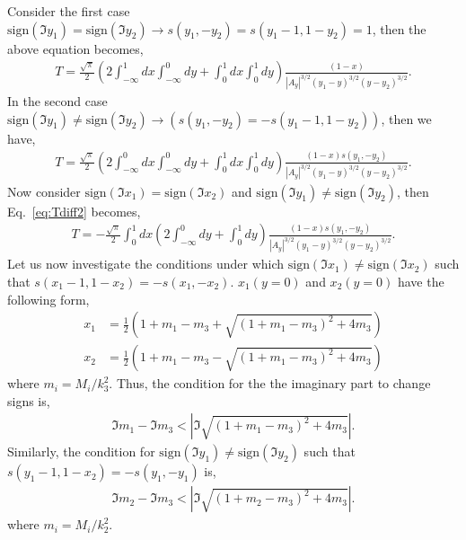 \documentclass[twoside]{article}
\begin{document}
Consider the first case $\textrm{sign}(\Im y_1) = \textrm{sign}(\Im y_2) \rightarrow s(y_1, -y_2) = s(y_1 - 1, 1 - y_2) = 1$, then the above equation becomes,
\begin{align}
  T = \frac{\sqrt{\pi}}{2}\left(2\int^1_{-\infty}dx\int^0_{-\infty}dy + \int^1_0dx\int^1_0dy
  \right)\frac{(1-x)}{|A_y|^{3/2}(y_1 - y)^{3/2}(y - y_2)^{3/2}}.
\end{align}
In the second case $\textrm{sign}(\Im y_1) \neq \textrm{sign}(\Im y_2) \rightarrow (s(y_1, -y_2) = -s(y_1 - 1, 1-y_2))$, then we have,
\begin{align}
  T = \frac{\sqrt{\pi}}{2}\left( 2\int^0_{-\infty}dx\int^0_{-\infty}dy + \int^1_0dx\int^1_0dy
  \right)\frac{(1-x)s(y_1,-y_2)}{|A_y|^{3/2}(y_1-y)^{3/2}(y-y_2)^{3/2}}.
\end{align}
Now consider $\textrm{sign}(\Im x_1) = \textrm{sign}(\Im x_2)$ and $\textrm{sign}(\Im y_1) \neq \textrm{sign}(\Im y_2)$, then
Eq.~\eqref{eq:Tdiff2} becomes,
\begin{align}
  T = -\frac{\sqrt{\pi}}{2}\int^1_0dx\left( 2\int^0_{-\infty}dy + \int^1_0dy
  \right)\frac{(1-x)s(y_1,-y_2)}{|A_y|^{3/2}(y_1-y)^{3/2}(y - y_2)^{3/2}}.
\end{align}
Let us now investigate the conditions under which $\textrm{sign}(\Im x_1) \neq \textrm{sign}(\Im x_2)$ such that $s(x_1 - 1 , 1 - x_2) =
-s(x_1, -x_2)$. $x_1(y = 0)$ and $x_2(y = 0)$ have the following form,
\begin{align}
  x_1 &=  \frac{1}{2}\left( 1 + m_1 - m_3 + \sqrt{(1 + m_1 - m_3)^2 + 4m_3} \right)\\
  x_2 &=  \frac{1}{2}\left( 1 + m_1 - m_3 - \sqrt{(1 + m_1 - m_3)^2 + 4m_3} \right)
\end{align}
where $m_i = M_i/k^2_3$. Thus, the condition for the the imaginary part to change signs is,
\begin{align}
  \Im m_1 - \Im m_3 < |\Im\sqrt{(1 + m_1 - m_3)^2 + 4m_3}|.
\end{align}
Similarly, the condition for $\textrm{sign}(\Im y_1) \neq \textrm{sign}(\Im y_2)$ such that $s(y_1 - 1, 1 - x_2) = -s(y_1, -y_1)$ is,
\begin{align}
  \Im m_2 - \Im m_3 < |\Im \sqrt{(1 + m_2 - m_3)^2 + 4m_3}|.
\end{align}
where $m_i = M_i/k^2_2$.
\end{document}
